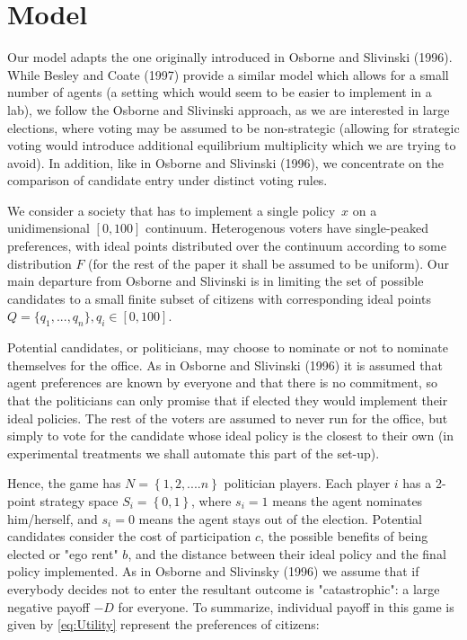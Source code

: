 \section{Model}

Our model adapts the one originally introduced in Osborne and Slivinski (1996). While Besley and Coate (1997) provide a similar model which allows for a small number of agents (a setting which would seem to be easier to implement in a lab), we follow the Osborne and Slivinski approach, as we are interested in large elections, where voting may be assumed to be non-strategic (allowing for strategic voting would introduce additional equilibrium multiplicity which we are trying to avoid). In addition, like in Osborne and Slivinski (1996), we concentrate on the comparison of candidate entry under distinct voting rules.

We consider a society that has to implement a single policy\ $x$ on a
unidimensional $\left[ 0,100\right] $ continuum. Heterogenous voters have
single-peaked preferences, with ideal points distributed over the continuum
according to some distribution $F$ (for the rest of the paper it shall be assumed to be uniform). Our main
departure from Osborne and Slivinski is in limiting the set of possible
candidates to a small finite subset of citizens with corresponding ideal points 
\(Q=\{q_1, ..., q_n\}, q_i \in \left[ 0,100\right]\). 

Potential candidates, or politicians, may choose to
nominate or not to nominate themselves for the office. As in Osborne and Slivinski (1996) it is assumed that agent preferences are known by everyone and that there is no commitment, so
that the politicians can only promise that if elected they would implement
their ideal policies. The rest of the
voters are assumed to never run for the office, but simply to vote for the
candidate whose ideal policy is the closest to their own (in experimental
treatments we shall automate this part of the set-up). 

Hence, the game has $N=\left\{ 1,2,....n\right\} $ politician
players. Each player $i$ has a 2-point strategy space $S_{i}=\left\{
0,1\right\} $, where $s_{i}=1$ means the agent nominates him/herself, and $%
s_{i}=0$ means the agent stays out of the election. Potential candidates consider the cost of participation $c$, the
possible benefits of being elected or "ego rent" $b$, and the distance between their ideal policy and the final policy implemented. As in Osborne and Slivinsky (1996) we assume that if everybody decides not to enter the resultant outcome is "catastrophic": a large negative payoff $-D$ for everyone. To summarize, individual payoff in this game is given by  \ref{eq:Utility} represent the preferences of citizens:

